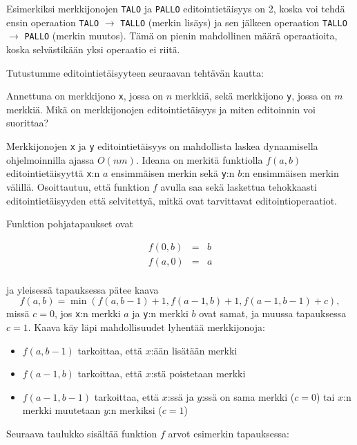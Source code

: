 Esimerkiksi merkkijonojen \texttt{TALO} ja \texttt{PALLO}
editointietäisyys on 2, koska voi tehdä ensin
operaation \texttt{TALO} $\rightarrow$ \texttt{TALLO}
(merkin lisäys) ja sen jälkeen operaation
\texttt{TALLO} $\rightarrow$ \texttt{PALLO}
(merkin muutos).
Tämä on pienin mahdollinen määrä operaatioita, koska
selvästikään yksi operaatio ei riitä.

Tutustumme editointietäisyyteen seuraavan tehtävän kautta:
\begin{task}
Annettuna on merkkijono \texttt{x},
jossa on $n$ merkkiä,
sekä merkkijono \texttt{y},
jossa on $m$ merkkiä.
Mikä on merkkijonojen editointietäisyys ja
miten editoinnin voi suorittaa?
\end{task}

Merkkijonojen \texttt{x} ja \texttt{y}
editointietäisyys on mahdollista
laskea dynaamisella ohjelmoinnilla ajassa $O(nm)$.
Ideana on merkitä funktiolla $f(a,b)$
editointietäisyyttä \texttt{x}:n $a$
ensimmäisen merkin sekä
\texttt{y}:n $b$:n ensimmäisen merkin välillä.
Osoittautuu, että funktion $f$ avulla saa sekä
laskettua tehokkaasti editointietäisyyden että
selvitettyä, mitkä ovat tarvittavat editointioperaatiot.

Funktion pohjatapaukset ovat

\[
\begin{array}{lcl}
f(0,b) & = & b \\
f(a,0) & = & a \\
\end{array}
\]

\noindent
ja yleisessä tapauksessa pätee kaava
\[ f(a,b) = \min(f(a,b-1)+1,f(a-1,b)+1,f(a-1,b-1)+c),\]
missä $c=0$, jos \texttt{x}:n merkki $a$
ja \texttt{y}:n merkki $b$ ovat samat,
ja muussa tapauksessa $c=1$.
Kaava käy läpi mahdollisuudet lyhentää merkkijonoja:

\begin{itemize}
\item $f(a,b-1)$ tarkoittaa, että $x$:ään lisätään merkki
\item $f(a-1,b)$ tarkoittaa, että $x$:stä poistetaan merkki
\item $f(a-1,b-1)$ tarkoittaa, että $x$:ssä ja $y$:ssä on
sama merkki ($c=0$) tai $x$:n merkki muutetaan $y$:n merkiksi ($c=1$)
\end{itemize}

Seuraava taulukko sisältää funktion $f$ arvot
esimerkin tapauksessa:

